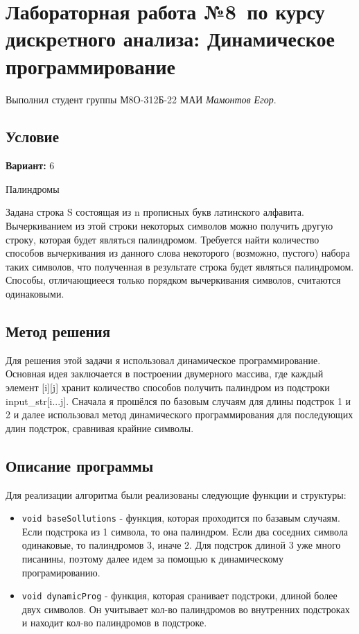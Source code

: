 \documentclass[12pt]{article}
\begin{document}
\section*{Лабораторная работа №8\, по курсу дискрeтного анализа: Динамическое программирование}

Выполнил студент группы М8О-312Б-22 МАИ \textit{Мамонтов Егор}.

\subsection*{Условие}

\textbf{Вариант:} 6

Палиндромы

Задана строка S состоящая из n прописных букв латинского алфавита. Вычеркиванием из этой строки некоторых символов можно получить другую строку, которая будет являться палиндромом. Требуется найти количество способов вычеркивания из данного слова некоторого (возможно, пустого) набора таких символов, что полученная в результате строка будет являться палиндромом. Способы, отличающиееся только порядком вычеркивания символов, считаются одинаковыми.
\newpage
\subsection*{Метод решения}

Для решения этой задачи я использовал динамическое программирование. Основная идея заключается в построении двумерного массива, где каждый элемент [i][j] хранит количество способов получить палиндром из подстроки input\_str[i...j].
Сначала я прошёлся по базовым случаям для длины подстрок 1 и 2 и далее использовал метод динамического программирования для последующих длин подстрок, сравнивая крайние символы.
\subsection*{Описание программы}

Для реализации алгоритма были реализованы следующие функции и структуры:
\begin{itemize}
    \item \texttt{void baseSollutions} - функция, которая проходится по базавым случаям. Если подстрока из 1 символа, то она палиндром. Если два соседних символа одинаковые, то палиндромов 3, иначе 2. Для подстрок длиной 3 уже много писанины, поэтому далее идем за помощью к динамическому програмированию.
    \item \texttt{void dynamicProg} - функция, которая сранивает подстроки, длиной более двух символов. Он учитывает кол-во палиндромов во внутренних подстроках и находит кол-во палиндромов в подстроке.
\end{itemize}
\end{document}
